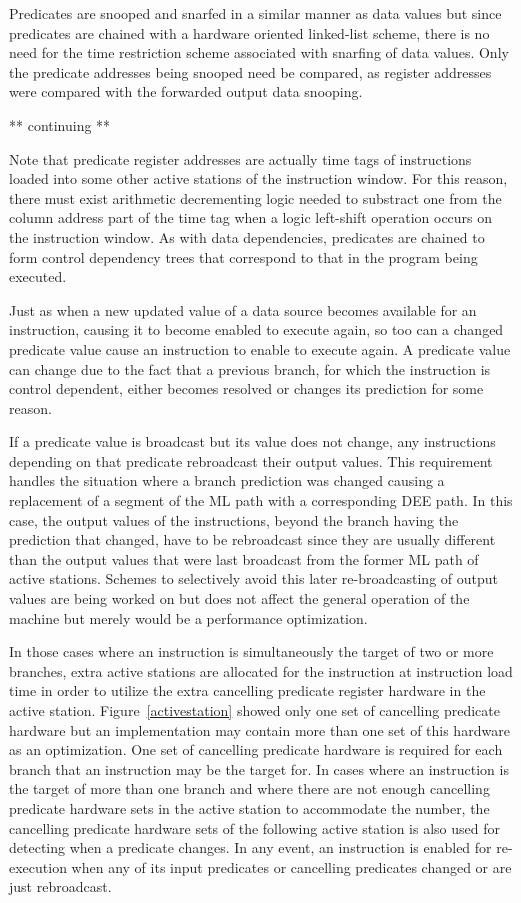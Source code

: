 
Predicates are snooped and snarfed in a similar manner as data values
but since predicates are chained with a hardware oriented linked-list
scheme, there is no need for the time restriction scheme associated
with snarfing of data values.  Only the predicate addresses being
snooped need be compared, as register addresses were compared with the
forwarded output data snooping.

** continuing **

Note that predicate register addresses are actually time tags of
instructions loaded into some other active stations of the 
instruction window.  For this reason, there must exist
arithmetic decrementing logic needed to substract one from the
column address part of the time tag when a logic left-shift
operation occurs on the instruction window.
As with data dependencies, predicates are chained to
form control dependency trees that correspond to that
in the program being executed.

Just as when a new updated value of a data source becomes
available for an instruction, causing it to become enabled to
execute again, so too can a changed predicate value cause
an instruction to enable to execute again.  A predicate
value can change due to the fact that a previous branch,
for which the instruction is control dependent, either becomes
resolved or changes its prediction for some reason.

If a predicate value is broadcast but its value does not change, any
instructions depending on that predicate rebroadcast their output
values.  This requirement handles the situation where a branch
prediction was changed causing a replacement of a segment of the ML
path with a corresponding DEE path.  In this case, the output values of
the instructions, beyond the branch having the prediction that changed,
have to be rebroadcast since they are usually different than the output
values that were last broadcast from the former ML path of active
stations.  Schemes to selectively avoid this later re-broadcasting of
output values are being worked on but does not affect the general
operation of the machine but merely would be a performance
optimization.

In those cases where an instruction is simultaneously the target of two
or more branches, extra active stations are allocated for the
instruction at instruction load time in order to utilize the extra
cancelling predicate register hardware in the active station.
Figure~\ref{activestation} showed only one set of cancelling predicate
hardware but an implementation may contain more than one set of this
hardware as an optimization.  One set of cancelling predicate hardware
is required for each branch that an instruction may be the target for.
In cases where an instruction is the target of more than one branch and
where there are not enough cancelling predicate hardware sets in the
active station to accommodate the number, the cancelling predicate
hardware sets of the following active station is also used for
detecting when a predicate changes.  In any event, an instruction is
enabled for re-execution when any of its input predicates or cancelling
predicates changed or are just rebroadcast.

